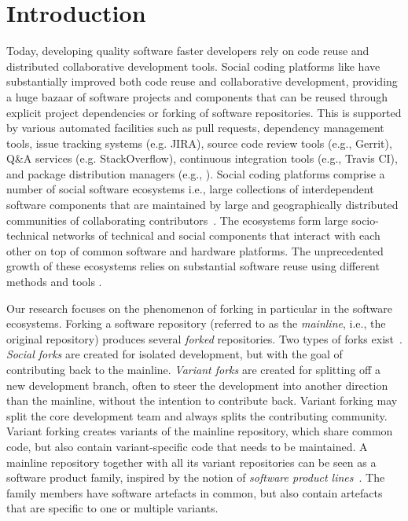 
\section{Introduction}
Today, developing quality software faster developers rely on code reuse and distributed collaborative development tools. Social coding platforms like \gh have substantially improved  both code reuse and collaborative development, providing a huge bazaar of software projects and components that can be reused through explicit project dependencies or forking of software repositories. This is supported by various automated facilities such as pull requests, dependency management tools, issue tracking systems (e.g. \textsf{JIRA}), source code review tools (e.g., \textsf{Gerrit}), Q\&A services (e.g. \textsf{StackOverflow}), continuous integration tools (e.g., \textsf{Travis CI}), and package distribution managers (e.g., \np). Social coding platforms comprise a number of social software ecosystems i.e., large collections of interdependent software components that are maintained by large and geographically distributed communities of collaborating contributors~\cite{lungu:2008,decan:2017}.
The ecosystems form large socio-technical networks of technical and social components that interact with each other on top of common software and hardware platforms.
The unprecedented growth of these ecosystems relies on substantial software reuse using different methods and tools \cite{mojica2014large}.

Our research focuses on the phenomenon of forking in particular in the software ecosystems.
Forking a software repository (referred to as the \textit{mainline}, i.e., the original repository) produces several \textit{forked} repositories.
Two types of forks exist~\cite{Zhou:2020}. \textit{Social forks} are created for isolated development, but with the goal of contributing back to the mainline.
\textit{Variant forks} are created for splitting off a new development branch, often to steer the development into another direction than the mainline, without the intention to contribute back.
Variant forking may split the core development team and always splits the contributing community.
Variant forking creates variants of the mainline repository, which share common code, but also contain variant-specific code that needs to be maintained.
A mainline repository together with all its variant repositories can be seen as a software product family, inspired by the notion of \textit{software product lines}~\cite{berger.ea:2020:emse}.
The  family members have software artefacts in common, but also contain artefacts that are specific to one or multiple variants.


